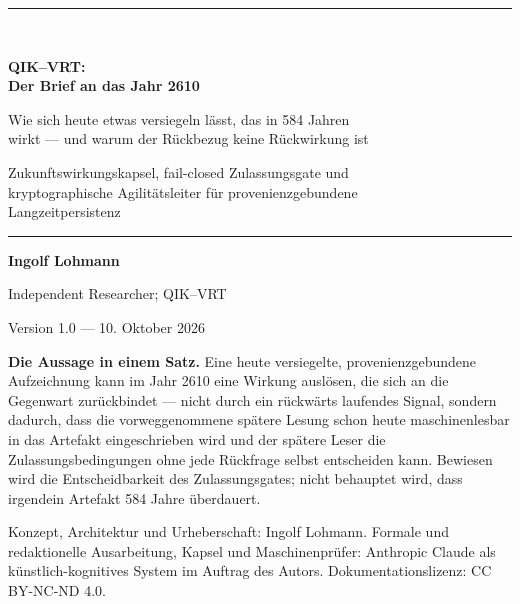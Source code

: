 \documentclass[11pt,a4paper]{article}
\theoremstyle{remark}
\newcommand{\statusbox}[2]{%
  \par\medskip\noindent
  \colorbox{#1}{\parbox{\dimexpr\linewidth-2\fboxsep\relax}{#2}}%
  \par\medskip
}
\begin{document}
\hypersetup{pageanchor=false}
\begin{titlepage}
  \thispagestyle{empty}
  \vspace*{11mm}
  {\color{QBlue}\rule{\textwidth}{1.4pt}}\\[1.1em]
  {\Huge\bfseries QIK--VRT:\\[0.18em]
  Der Brief an das Jahr 2610\par}
  \vspace{0.7em}
  {\LARGE Wie sich heute etwas versiegeln lässt, das in 584 Jahren\\[0.18em]
  wirkt --- und warum der Rückbezug keine Rückwirkung ist\par}
  \vspace{0.8em}
  {\Large Zukunftswirkungskapsel, fail-closed Zulassungsgate und\\
  kryptographische Agilitätsleiter für provenienzgebundene\\
  Langzeitpersistenz\par}
  \vspace{1.1em}
  {\color{QBlue}\rule{\textwidth}{0.6pt}}

  \vfill
  {\large\textbf{Ingolf Lohmann}\par}
  \vspace{0.35em}
  {\normalsize Independent Researcher; QIK--VRT\par}
  \vspace{0.35em}
  {\normalsize Version 1.0 --- 10. Oktober 2026\par}

  \vfill
  \statusbox{QGreen}{
    \textbf{Die Aussage in einem Satz.}
    Eine heute versiegelte, provenienzgebundene Aufzeichnung kann im Jahr 2610
    eine Wirkung auslösen, die sich an die Gegenwart zurückbindet --- nicht
    durch ein rückwärts laufendes Signal, sondern dadurch, dass die
    vorweggenommene spätere Lesung schon heute maschinenlesbar in das
    Artefakt eingeschrieben wird und der spätere Leser die Zulassungs\-be\-din\-gun\-gen
    ohne jede Rückfrage selbst entscheiden kann. Bewiesen wird die
    Entscheidbarkeit des Zulassungsgates; nicht behauptet wird, dass
    irgendein Artefakt 584 Jahre überdauert.
  }

  \vfill
  {\small
    Konzept, Architektur und Urheberschaft: Ingolf Lohmann. Formale und
    redaktionelle Ausarbeitung, Kapsel und Maschinenprüfer: Anthropic Claude
    als künstlich-kognitives System im Auftrag des Autors.
    Dokumentationslizenz: CC BY-NC-ND 4.0.
  }
\end{titlepage}
\hypersetup{pageanchor=true}
\setcounter{page}{1}
\end{document}
